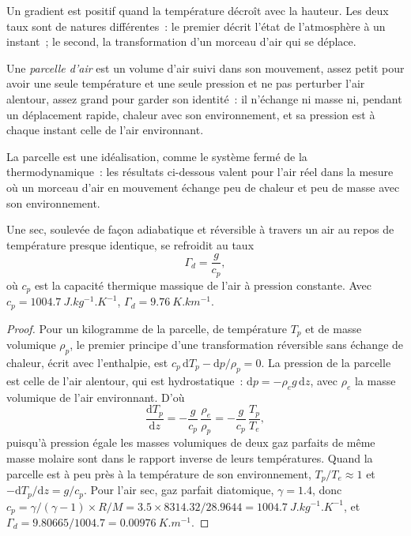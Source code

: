 Un gradient est positif quand la température décroît avec la hauteur. Les deux taux
sont de natures différentes~: le premier décrit l'état de l'atmosphère à un
instant~; le second, la transformation d'un morceau d'air qui se déplace.

\begin{definition}\label{def:b1:fluid-envelopes-structure:parcel}
Une \emph{parcelle d'air} est un volume d'air suivi dans son
mouvement, assez petit pour avoir une seule température et une seule pression et ne pas
perturber l'air alentour, assez grand pour garder son identité~: il n'échange ni
masse ni, pendant un déplacement rapide, chaleur avec son environnement, et sa
pression est à chaque instant celle de l'air environnant.
\end{definition}

La parcelle est une idéalisation, comme le système fermé de la thermodynamique~: les
résultats ci-dessous valent pour l'air réel dans la mesure où un morceau d'air en mouvement échange
peu de chaleur et peu de masse avec son environnement.

\begin{theorem}\label{thm:b1:fluid-envelopes-structure:dry-adiabatic}
Une  sec, soulevée de façon adiabatique et réversible à travers un air au repos de
température presque identique, se refroidit au taux
\[
  \Gamma_d = \frac{g}{c_p},
\]
où $c_p$ est la capacité thermique massique de l'air à pression constante. Avec $c_p =
\qty{1004.7}{J.kg^{-1}.K^{-1}}$, $\Gamma_d = \qty{9.76}{K.km^{-1}}$.
\end{theorem}

\begin{proof}
Pour un kilogramme de la parcelle, de température $T_p$ et de masse volumique $\rho_p$, le
premier principe d'une transformation réversible sans échange de chaleur, écrit avec
l'enthalpie, est $c_p\,\mathrm dT_p - \mathrm dp/\rho_p = 0$. La pression de la
parcelle est celle de l'air alentour, qui est hydrostatique~: $\mathrm dp = -\rho_e
g\,\mathrm dz$, avec $\rho_e$ la masse volumique de l'air environnant. D'où
\[
  \frac{\mathrm dT_p}{\mathrm dz} = -\frac{g}{c_p}\,\frac{\rho_e}{\rho_p}
  = -\frac{g}{c_p}\,\frac{T_p}{T_e},
\]
puisqu'à pression égale les masses volumiques de deux gaz parfaits de même masse molaire
sont dans le rapport inverse de leurs températures. Quand la parcelle est à peu près à la
température de son environnement, $T_p/T_e \approx 1$ et $-\mathrm dT_p/\mathrm dz
= g/c_p$. Pour l'air sec, gaz parfait diatomique, $\gamma = 1.4$, donc $c_p =
\gamma/(\gamma - 1) \times R/M = 3.5 \times 8314.32/28.9644 =
\qty{1004.7}{J.kg^{-1}.K^{-1}}$, et $\Gamma_d = 9.80665/1004.7 =
\qty{0.00976}{K.m^{-1}}$.
\end{proof}

